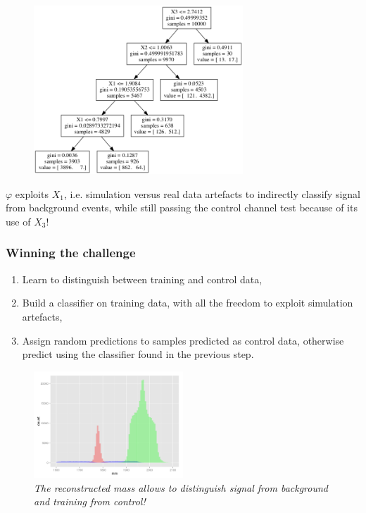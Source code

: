 \documentclass{beamer}
\begin{document}

\begin{frame}
\begin{figure}
\centering
\includegraphics[width=0.7\textwidth]{figures/tree.png}
\end{figure}

$\varphi$ exploits $X_1$, i.e. simulation versus real data
artefacts to indirectly classify signal from background events, {\color{red}while still passing the
control channel test} because of its use of $X_3$!

\end{frame}


\begin{frame}
\frametitle{Winning the challenge}

\begin{enumerate}
\item Learn to distinguish between training and control data,
\item Build a classifier on training data, with all the freedom to exploit simulation artefacts,
\item Assign random predictions to samples predicted as control data, otherwise predict using the classifier found in the previous step.
\end{enumerate}

\begin{figure}
\centering
\includegraphics[width=0.5\textwidth]{figures/hole.png}\\
{\it The reconstructed mass allows to distinguish {\color{red} signal} from {\color{blue} background} and training from {\color{mygreen} control}!}
\end{figure}

\end{frame}
\end{document}
